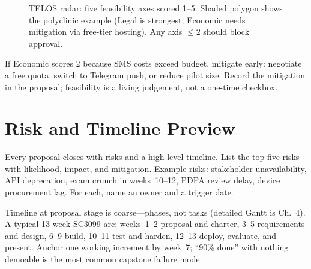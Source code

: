 \begin{figure}[h]
\centering
{}
\caption{TELOS radar: five feasibility axes scored 1--5. Shaded polygon shows the polyclinic example (Legal is strongest; Economic needs mitigation via free-tier hosting). Any axis $\le 2$ should block approval.}
\label{fig:telos-radar}
\end{figure}

If Economic scores 2 because SMS costs exceed budget, mitigate early: negotiate a free quota, switch to Telegram push, or reduce pilot size. Record the mitigation in the proposal; feasibility is a living judgement, not a one-time checkbox.

\section{Risk and Timeline Preview}
\label{sec:risk-timeline}

Every proposal closes with risks and a high-level timeline. List the top five risks with likelihood, impact, and mitigation. Example risks: stakeholder unavailability, API deprecation, exam crunch in weeks~10--12, PDPA review delay, device procurement lag. For each, name an owner and a trigger date.

Timeline at proposal stage is coarse---phases, not tasks (detailed Gantt is Ch.~4). A typical 13-week SC3099 arc: weeks~1--2 proposal and charter, 3--5 requirements and design, 6--9 build, 10--11 test and harden, 12--13 deploy, evaluate, and present. Anchor one working increment by week~7; ``90\% done'' with nothing demoable is the most common capstone failure mode.

